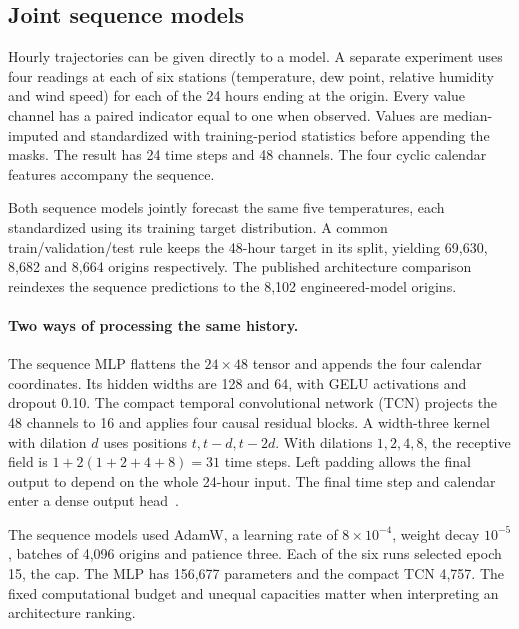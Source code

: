 \documentclass[11pt,letterpaper]{article}
\begin{document}
\subsection{Joint sequence models}\label{sequence}
Hourly trajectories can be given directly to a model. A separate experiment uses four readings at each of six stations (temperature, dew point, relative humidity and wind speed) for each of the 24 hours ending at the origin. Every value channel has a paired indicator equal to one when observed. Values are median-imputed and standardized with training-period statistics before appending the masks. The result has 24 time steps and 48 channels. The four cyclic calendar features accompany the sequence.

Both sequence models jointly forecast the same five temperatures, each standardized using its training target distribution. A common train/validation/test rule keeps the 48-hour target in its split, yielding 69,630, 8,682 and 8,664 origins respectively. The published architecture comparison reindexes the sequence predictions to the 8,102 engineered-model origins.

\paragraph{Two ways of processing the same history.}
The sequence MLP flattens the $24\times48$ tensor and appends the four calendar coordinates. Its hidden widths are 128 and 64, with GELU activations and dropout 0.10. The compact temporal convolutional network (TCN) projects the 48 channels to 16 and applies four causal residual blocks. A width-three kernel with dilation $d$ uses positions $t,t-d,t-2d$. With dilations $1,2,4,8$, the receptive field is $1+2(1+2+4+8)=31$ time steps. Left padding allows the final output to depend on the whole 24-hour input. The final time step and calendar enter a dense output head~\cite{tcn}.

The sequence models used AdamW, a learning rate of $8\times10^{-4}$, weight decay $10^{-5}$, batches of 4,096 origins and patience three. Each of the six runs selected epoch 15, the cap. The MLP has 156,677 parameters and the compact TCN 4,757. The fixed computational budget and unequal capacities matter when interpreting an architecture ranking.
\end{document}
